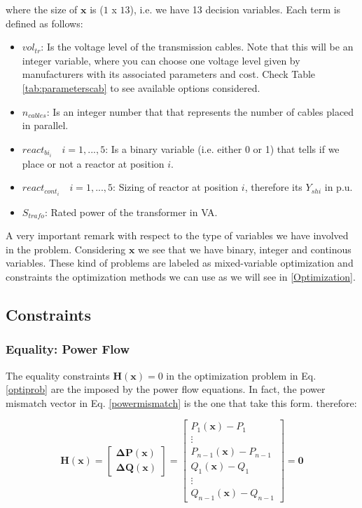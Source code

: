 \documentclass[a4paper,11pt, titlepage, twoside]{article}
\begin{document}
where the size of $\mathbf{x}$ is ($1$ x $13$), i.e. we have 13 decision variables. Each term is defined as follows:
\begin{itemize}
    \item $vol_{tr}$: Is the voltage level of the transmission cables. Note that this will be an integer variable, where you can choose one voltage level
    given by manufacturers with its associated parameters and cost. Check Table \ref{tab:parameterscab} to see available options considered.
    \item $n_{cables}$: Is an integer number that that represents the number of cables placed in parallel.
    \item $react_{bi_i} \quad i=1,...,5$: Is a binary variable (i.e. either 0 or 1) that tells if we place or not a reactor at position $i$.
    \item $react_{cont_i} \quad i=1,...,5$: Sizing of reactor at position $i$, therefore its $Y_{shi}$ in p.u.
    \item $S_{trafo}$: Rated power of the transformer in VA.
\end{itemize}

A very important remark with respect to the type of variables we have involved in the problem. Considering $\mathbf{x}$ we see that we have 
binary, integer and continous variables. These kind of problems are labeled as mixed-variable optimization and constraints the optimization 
methods we can use as we will see in \ref{Optimization}.


\subsection{Constraints}
\subsubsection{Equality: Power Flow}\label{equality}

The equality constraints $ \mathbf{H(x)} = 0$ in the optimization problem in  Eq. \ref{optiprob} are the imposed by the power flow equations. In fact, the power mismatch vector in Eq. \ref{powermismatch} is the one that take this form. therefore:

\begin{equation}
    \mathbf{H(x)} = \begin{bmatrix}
    \mathbf{\Delta P(\mathbf{x})} \\
    \mathbf{\Delta Q(\mathbf{x})}
    \end{bmatrix} = \begin{bmatrix}
    P_1(\mathbf{x}) - P_1 \\
    \vdots \\
    P_{n-1}(\mathbf{x}) - P_{n-1} \\
    Q_1(\mathbf{x}) - Q_1 \\
    \vdots \\
    Q_{n-1}(\mathbf{x}) - Q_{n-1}
    \end{bmatrix} = \mathbf{0}
\end{equation}
\end{document}
